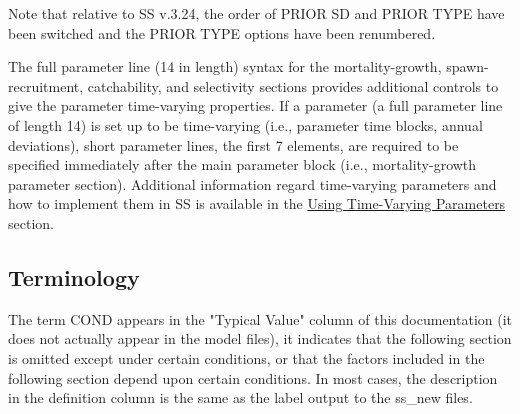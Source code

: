 Note that relative to SS v.3.24,  the order of PRIOR SD and PRIOR TYPE have been switched and the PRIOR TYPE options have been renumbered.

The full parameter line (14 in length) syntax for the mortality-growth, spawn-recruitment, catchability, and selectivity sections provides additional controls to give the parameter time-varying properties.  If a parameter (a full parameter line of length 14) is set up to be time-varying (i.e., parameter time blocks, annual deviations), short parameter lines, the first 7 elements, are required to be specified immediately after the main parameter block (i.e., mortality-growth parameter section).  Additional information regard time-varying parameters and how to implement them in SS is available in the \hyperlink{TVpara}{Using Time-Varying Parameters} section.


\subsection{Terminology}
The term COND appears in the "Typical Value" column of this documentation (it does not actually appear in the model files), it indicates that the following section is omitted except under certain conditions, or that the factors included in the following section depend upon certain conditions. In most cases, the description in the definition column is the same as the label output to the ss\_new files.

